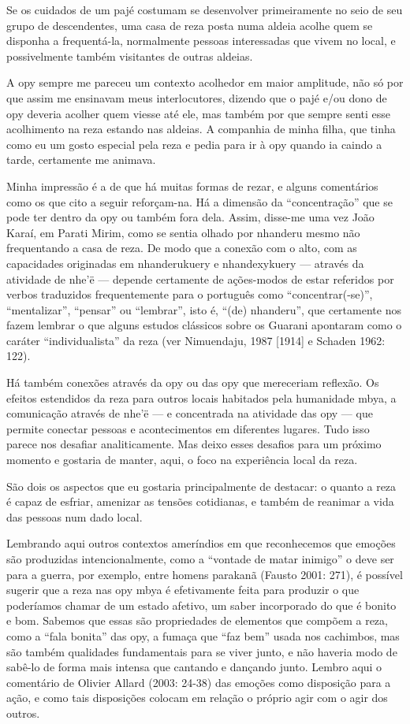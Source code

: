 Se os cuidados de um pajé costumam se desenvolver primeiramente no seio
de seu grupo de descendentes, uma casa de reza posta numa aldeia acolhe
quem se disponha a frequentá-la, normalmente pessoas interessadas que
vivem no local, e possivelmente também visitantes de outras aldeias.

A opy sempre me pareceu um contexto acolhedor em maior amplitude, não só
por que assim me ensinavam meus interlocutores, dizendo que o pajé e/ou
dono de opy deveria acolher quem viesse até ele, mas também por que
sempre senti esse acolhimento na reza estando nas aldeias. A companhia
de minha filha, que tinha como eu um gosto especial pela reza e pedia
para ir à opy quando ia caindo a tarde, certamente me animava.

Minha impressão é a de que há muitas formas de rezar, e alguns
comentários como os que cito a seguir reforçam-na. Há a dimensão da
``concentração'' que se pode ter dentro da opy ou também fora dela.
Assim, disse-me uma vez João Karaí, em Parati Mirim, como se sentia
olhado por nhanderu mesmo não frequentando a casa de reza. De modo que
a conexão com o alto, com as capacidades originadas em nhanderukuery e
nhandexykuery — através da atividade de nhe’ë — depende certamente de
ações-modos de estar referidos por verbos traduzidos frequentemente
para o português como ``concentrar(-se)'',  ``mentalizar'', ``pensar'' ou
``lembrar'', isto é, ``(de) nhanderu'', que certamente nos fazem lembrar o
que alguns estudos clássicos sobre os Guarani apontaram como o caráter
``individualista'' da reza (ver Nimuendaju, 1987 [1914] e Schaden 1962:
122). 

Há também conexões através da opy ou das opy que mereceriam reflexão. Os
efeitos estendidos da reza para outros locais habitados pela humanidade
mbya, a comunicação através de nhe’ë — e concentrada na atividade das
opy — que permite conectar pessoas e acontecimentos em diferentes
lugares. Tudo isso parece nos desafiar analiticamente. Mas deixo esses
desafios para um próximo momento e gostaria de manter, aqui, o foco na
experiência local da reza.

São dois os aspectos que eu gostaria principalmente de destacar: o
quanto a reza é capaz de esfriar, amenizar as tensões cotidianas, e
também de reanimar a vida das pessoas num dado local.

Lembrando aqui outros contextos ameríndios em que reconhecemos que
emoções são produzidas intencionalmente, como a ``vontade de matar
inimigo'' o deve ser para a guerra, por exemplo, entre homens parakanã
(Fausto 2001: 271), é possível sugerir que a reza nas opy mbya é
efetivamente feita para produzir o que poderíamos chamar de um estado
afetivo, um saber incorporado do que é bonito e bom. Sabemos que essas
são propriedades de elementos que compõem a reza, como a ``fala bonita''
das opy, a fumaça que ``faz bem'' usada nos cachimbos, mas são também
qualidades fundamentais para se viver junto, e não haveria modo de
sabê-lo de forma mais intensa que cantando e dançando junto. Lembro
aqui o comentário de Olivier Allard (2003: 24-38) das emoções como
disposição para a ação, e como tais disposições colocam em relação o
próprio agir com o agir dos outros.

